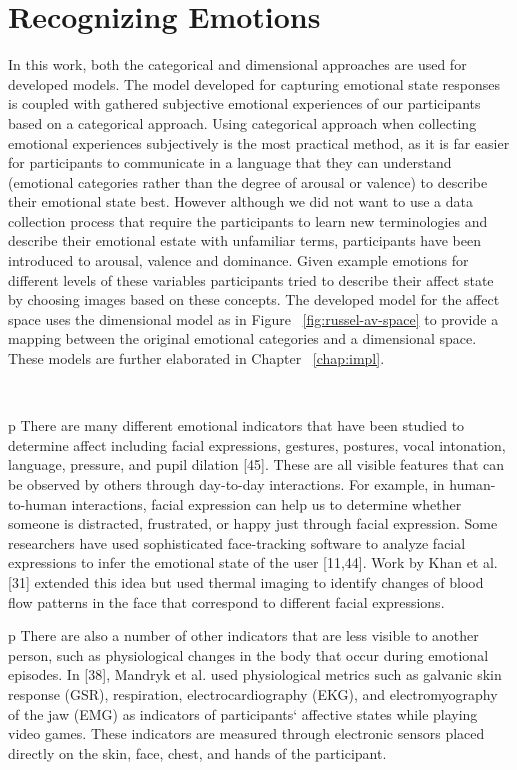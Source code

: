 \documentclass{uofsthesis-cs}
\begin{document}
\section{Recognizing Emotions}

In this work, both the categorical and dimensional approaches are used for developed models. The model developed for capturing emotional state responses is coupled with gathered subjective emotional experiences of our participants based on a categorical approach. Using categorical approach when collecting emotional experiences subjectively is the most practical method, as it is far easier for participants to communicate in a language that they can understand (emotional categories rather than the degree of arousal or valence) to describe their emotional state best. However although we did not want to use a data collection process that require the participants to learn new terminologies and describe their emotional estate with unfamiliar terms, participants have been introduced to arousal, valence and dominance. Given example emotions for different levels of these variables participants tried to describe their affect state by choosing images based on these concepts. The developed model for the affect space uses the dimensional model as in Figure ~\ref{fig:russel-av-space} to provide a mapping between the original emotional categories and a dimensional space. These models are further elaborated in Chapter ~\ref{chap:impl}.

~\cite{picard2003affective}

p There are many different emotional indicators that have been studied to determine affect including facial expressions, gestures, postures, vocal intonation, language, pressure, and pupil dilation [45]. These are all visible features that can be observed by others through day-to-day interactions. For example, in human-to-human interactions, facial expression can help us to determine whether someone is distracted, frustrated, or happy just through facial expression. Some researchers have used sophisticated face-tracking software to analyze facial expressions to infer the emotional state of the user [11,44]. Work by Khan et al. [31] extended this idea but used thermal imaging to identify changes of blood flow patterns in the face that correspond to different facial expressions. 

p There are also a number of other indicators that are less visible to another person, such as physiological changes in the body that occur during emotional episodes. In [38], Mandryk et al. used physiological metrics such as galvanic skin response (GSR), respiration, electrocardiography (EKG), and electromyography of the jaw (EMG) as indicators of participants‘ affective states while playing video games. These indicators are measured through electronic sensors placed directly on the skin, face, chest, and hands of the participant.
\end{document}
